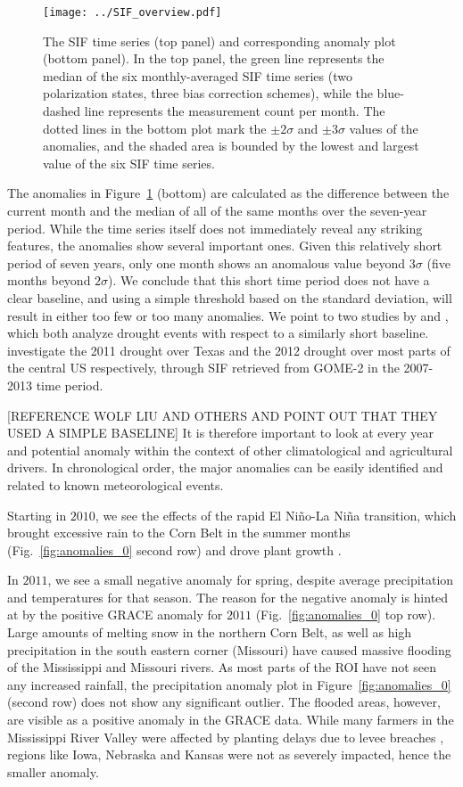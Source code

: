 \documentclass[preprint, a4paper, 10pt, times]{elsarticle}
\begin{document}
\begin{figure}[htbp]
\centering
\texttt{[image: ../SIF\_overview.pdf]}
\caption{The SIF time series (top panel) and corresponding anomaly plot (bottom panel). In the top panel, the green line represents the median of the six monthly-averaged SIF time series (two polarization states, three bias correction schemes), while the blue-dashed line represents the measurement count per month. The dotted lines in the bottom plot mark the $\pm 2\sigma$ and $\pm 3\sigma$ values of the anomalies, and the shaded area is bounded by the lowest and largest value of the six SIF time series.}
\label{fig:sif_ts}
\end{figure}

The anomalies in Figure~\ref{fig:sif_ts} (bottom) are calculated as the difference between the current month and the median of all of the same months over the seven-year period. While the time series itself does not immediately reveal any striking features, the anomalies show several important ones. Given this relatively short period of seven years, only one month shows an anomalous value beyond $3\sigma$ (five months beyond $2\sigma$). We conclude that this short time period does not have a clear baseline, and using a simple threshold based on the standard deviation, will result in either too few or too many anomalies. We point to two studies by \citet{sun2015drought} and \citet{wolf2016warm}, which both analyze drought events with respect to a similarly short baseline. \citet{sun2015drought} investigate the 2011 drought over Texas and the 2012 drought over most parts of the central US respectively, through SIF retrieved from GOME-2 in the 2007-2013 time period.  

[REFERENCE WOLF LIU AND OTHERS AND POINT OUT THAT THEY USED A SIMPLE BASELINE] It is therefore important to look at every year and potential anomaly within the context of other climatological and agricultural drivers. In chronological order, the major anomalies can be easily identified and related to known meteorological events. 

Starting in $2010$, we see the effects of the rapid El Ni\~no-La Ni\~na transition, which brought excessive rain to the Corn Belt in the summer months (Fig.~\ref{fig:anomalies_0} second row) and drove plant growth \citep{USDA2010}.

In $2011$, we see a small negative anomaly for spring, despite average precipitation and temperatures for that season. The reason for the negative anomaly is hinted at by the positive GRACE anomaly for $2011$ (Fig.~\ref{fig:anomalies_0} top row). Large amounts of melting snow in the northern Corn Belt, as well as high precipitation in the south eastern corner (Missouri) have caused massive flooding of the Mississippi and Missouri rivers. As most parts of the ROI have not seen any increased rainfall, the precipitation anomaly plot in Figure~\ref{fig:anomalies_0} (second row) does not show any significant outlier. The flooded areas, however, are visible as a positive anomaly in the GRACE data. While many farmers in the Mississippi River Valley were affected by planting delays due to levee breaches \citep{olson2012impacts}, regions like Iowa, Nebraska and Kansas were not as severely impacted, hence the smaller anomaly. 
\end{document}
